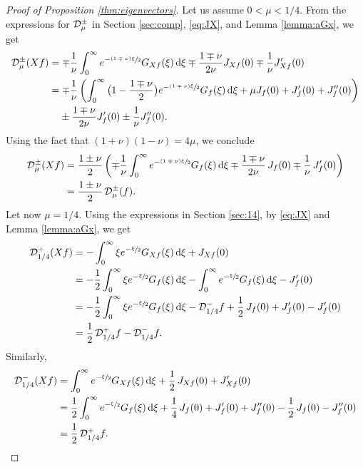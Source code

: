 \documentclass[11pt]{article}
\newcommand{\tpsfrac}[3]{\sfrac{(#1)#3}{#2}}
\newcommand*{\diff}{\mathop{}\!\mathrm{d}}
\newcommand{\Dpm}[1]{\mathcal{D}_\mu^{\pm} #1}
\newcommand{\Dpmp}[1]{\mathcal{D}_\mu^{\pm}(#1)}
\theoremstyle{definition}
\begin{document}
\begin{proof}[{Proof of Proposition \ref{thm:eigenvectors}}]
Let us assume $0<\mu< 1/4$. From the expressions for $\Dpm$ in Section \ref{sec:comp}, \eqref{eq:JX}, and Lemma \ref{lemma:aGx}, we get
\begin{equation*}
\begin{split}
\Dpmp{Xf} &= \mp \frac{1}{\nu} \int_0^\infty e^{-\tpsfrac{1 \mp \nu}{2}\xi} G_{Xf}(\xi) \diff \xi \mp \frac{1 \mp \nu}{2\nu} J_{Xf}(0) \mp \frac{1}{\nu} J'_{Xf}(0)\\
&= \mp \frac{1}{\nu} \left(\int_0^\infty \big(1 -\frac{1 \mp \nu}{2}\big) e^{-\tpsfrac{1 \mp \nu}{2}\xi} G_f(\xi) \diff \xi + \mu J_f(0) + J_f'(0) + J_f''(0) \right) \\
&\hphantom{{}=} \pm \frac{1 \mp \nu}{2\nu} J'_f(0) \pm \frac{1}{\nu} J''_f(0).
\end{split}
\end{equation*}
Using the fact that $(1+\nu)(1-\nu) = 4 \mu$, we conclude
\begin{align*}
\Dpmp{Xf} &= \frac{1 \pm \nu}{2} \left(\mp \frac{1}{\nu} \int_0^\infty e^{-\tpsfrac{1 \mp \nu}{2}\xi} G_f(\xi) \diff \xi \mp \frac{1 \mp \nu}{2\nu} \,J_f(0) \mp \frac{1}{\nu}\, J_f'(0) \right)\\
& = \frac{1 \pm \nu}{2}\, \Dpmp{f}.
\end{align*}
Let now $\mu = 1/4$. Using the expressions in Section \ref{sec:14}, by \eqref{eq:JX} and Lemma \ref{lemma:aGx}, we get
\begin{align*}
\mathcal{D}_{1/4}^{+}(Xf) &= - \int_0^\infty \xi e^{-\sfrac{\xi}{2}} G_{Xf}(\xi) \diff \xi + J_{Xf}(0)\\
&=- \frac{1}{2} \int_0^\infty \xi e^{-\sfrac{\xi}{2}} G_{f}(\xi) \diff \xi -\int_0^\infty e^{-\sfrac{\xi}{2}} G_{f}(\xi) \diff \xi -J_f'(0) \\
&=- \frac{1}{2} \int_0^\infty \xi e^{-\sfrac{\xi}{2}} G_{f}(\xi) \diff \xi -\mathcal{D}_{1/4}^{-}f +\frac{1}{2}\,J_f(0) + J_f'(0) -J_f'(0)\\
& = \frac{1}{2}\, \mathcal{D}_{1/4}^{+}f - \mathcal{D}_{1/4}^{-}f .
\end{align*}
Similarly,
\begin{align*}
\mathcal{D}_{1/4}^{-}(Xf) &= \int_0^\infty e^{-\sfrac{\xi}{2}} G_{Xf}(\xi) \diff \xi + \frac{1}{2}\, J_{Xf}(0) + J_{Xf}'(0)\\
&=\frac{1}{2}\int_0^\infty e^{-\sfrac{\xi}{2}} G_{f}(\xi) \diff \xi + \frac{1}{4}\, J_f(0) + J'_f(0) + J_f''(0) - \frac{1}{2}\,J_{f}(0) - J_{f}''(0)\\
& = \frac{1}{2}\, \mathcal{D}_{1/4}^{+}f.
\end{align*}


\end{proof}
\end{document}
